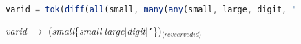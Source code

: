 \begin{figure}
    \centering
    \begin{lstlisting}[language=JavaScript]
varid = tok(diff(all(small, many(any(small, large, digit, "'"))), reservedid), Token.VARID)\end{lstlisting}
    \caption{
    {\it varid} $\rightarrow$ ({\it small}\{{\it small}$|${\it large}$|${\it digit}$|${\tt '}\})$_{\langle revservedid\rangle}$
    }
    \label{fig:varid-lexer}
\end{figure}